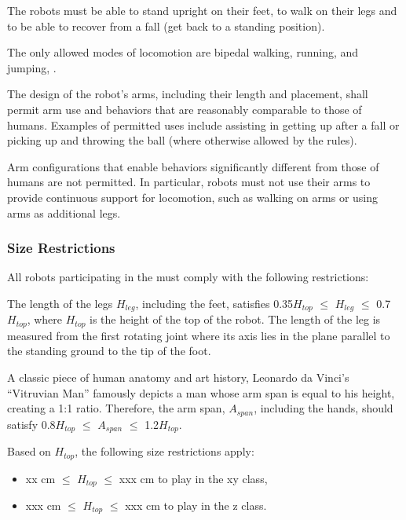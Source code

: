 The robots must be able to stand upright on their feet, to walk on their legs and to be able to recover from a fall (get back to a standing position). 

The only allowed modes of locomotion are bipedal walking, running, and jumping, .

The design of the robot's arms, including their length and placement, shall permit arm use and behaviors that are reasonably comparable to those of humans. Examples of permitted uses include  
assisting in getting up after a fall or picking up and throwing the ball (where otherwise allowed by the rules).

Arm configurations that enable behaviors significantly different from those of humans are not permitted. In particular, 
robots must not use their arms to provide continuous support for locomotion, such as walking on arms or using arms as additional legs.

\subsubsection{Size Restrictions}

All robots participating in the \leaguenameabbr must comply with the following restrictions:

The length of the legs $H_{leg}$, including the feet, satisfies 0.35{\textperiodcentered}$H_{top}$ ${\leq}$ $H_{leg}$ ${\leq}$ 0.7{\textperiodcentered}$H_{top}$,  where $H_{top}$ is the height of the top of the robot. 
The length of the leg is measured from the first rotating joint where its axis lies in the plane parallel to the standing ground to the tip of the foot.

A classic piece of human anatomy and art history, Leonardo da Vinci’s “Vitruvian Man” famously depicts a man whose arm span is equal to his height, creating a 1:1 ratio. 
Therefore, the arm span, $A_{span}$, including the hands, should satisfy 0.8{\textperiodcentered}$H_{top}$ ${\leq}$ $A_{span}$ ${\leq}$ 1.2{\textperiodcentered}$H_{top}$.

Based on $H_{top}$, the following size restrictions apply:

\begin{itemize}
\item xx cm ${\leq}$ $H_{top}$ ${\leq}$ xxx cm to play in the xy class, 
\item xxx cm ${\leq}$ $H_{top}$ ${\leq}$ xxx cm to play in the z class.
\end{itemize}

